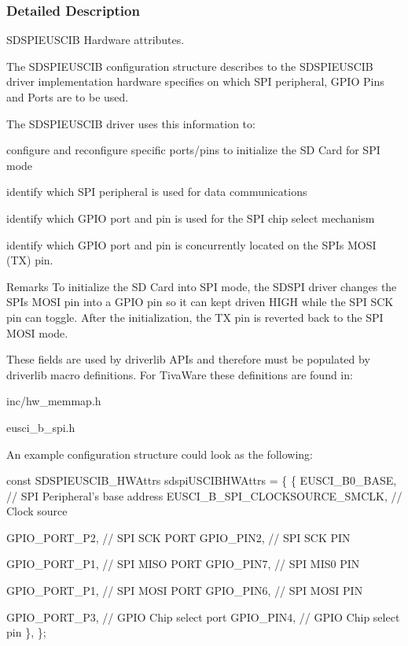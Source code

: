 \subsubsection{Detailed Description}
S\+D\+S\+P\+I\+E\+U\+S\+C\+I\+B Hardware attributes. 

The S\+D\+S\+P\+I\+E\+U\+S\+C\+I\+B configuration structure describes to the S\+D\+S\+P\+I\+E\+U\+S\+C\+I\+B driver implementation hardware specifies on which S\+P\+I peripheral, G\+P\+I\+O Pins and Ports are to be used.

The S\+D\+S\+P\+I\+E\+U\+S\+C\+I\+B driver uses this information to\+:
\begin{DoxyItemize}
\item configure and reconfigure specific ports/pins to initialize the S\+D Card for S\+P\+I mode
\item identify which S\+P\+I peripheral is used for data communications
\item identify which G\+P\+I\+O port and pin is used for the S\+P\+I chip select mechanism
\item identify which G\+P\+I\+O port and pin is concurrently located on the S\+P\+I\textquotesingle{}s M\+O\+S\+I (T\+X) pin.
\end{DoxyItemize}

\begin{DoxyRemark}{Remarks}
To initialize the S\+D Card into S\+P\+I mode, the S\+D\+S\+P\+I driver changes the S\+P\+I\textquotesingle{}s M\+O\+S\+I pin into a G\+P\+I\+O pin so it can kept driven H\+I\+G\+H while the S\+P\+I S\+C\+K pin can toggle. After the initialization, the T\+X pin is reverted back to the S\+P\+I M\+O\+S\+I mode.
\end{DoxyRemark}
These fields are used by driverlib A\+P\+Is and therefore must be populated by driverlib macro definitions. For Tiva\+Ware these definitions are found in\+:
\begin{DoxyItemize}
\item inc/hw\+\_\+memmap.\+h
\item eusci\+\_\+b\+\_\+spi.\+h
\end{DoxyItemize}

An example configuration structure could look as the following\+: 
\begin{DoxyCode}
\textcolor{keyword}{const} SDSPIEUSCIB_HWAttrs sdspiUSCIBHWAttrs = \{
    \{
         EUSCI\_B0\_BASE, \textcolor{comment}{// SPI Peripheral's base address}
         EUSCI\_B\_SPI\_CLOCKSOURCE\_SMCLK, \textcolor{comment}{// Clock source}

         GPIO\_PORT\_P2,  \textcolor{comment}{// SPI SCK PORT}
         GPIO\_PIN2,     \textcolor{comment}{// SPI SCK PIN}

         GPIO\_PORT\_P1,  \textcolor{comment}{// SPI MISO PORT}
         GPIO\_PIN7,     \textcolor{comment}{// SPI MIS0 PIN}

         GPIO\_PORT\_P1,  \textcolor{comment}{// SPI MOSI PORT}
         GPIO\_PIN6,     \textcolor{comment}{// SPI MOSI PIN}

         GPIO\_PORT\_P3,  \textcolor{comment}{// GPIO Chip select port}
         GPIO\_PIN4,     \textcolor{comment}{// GPIO Chip select pin}
     \},
\};
\end{DoxyCode}
 

